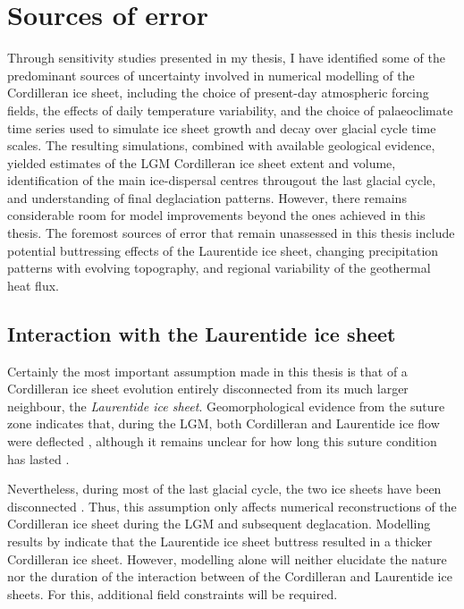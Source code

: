\documentclass[a4paper]{kappa}
\begin{document}
\section{Sources of error}

Through sensitivity studies presented in my thesis, I have identified some of
the predominant sources of uncertainty involved in numerical modelling of the
Cordilleran ice sheet, including the choice of present-day atmospheric forcing
fields, the effects of daily temperature variability, and the choice of
palaeoclimate time series used to simulate ice sheet growth and decay over
glacial cycle
time scales. The resulting simulations, combined with available geological
evidence, yielded estimates of the LGM Cordilleran ice sheet extent and volume,
identification of the main ice-dispersal centres througout the last glacial
cycle, and understanding of final deglaciation patterns. However, there remains
considerable room for model improvements beyond the ones achieved in this
thesis. The foremost sources of error that remain unassessed in this thesis
include potential buttressing effects of the Laurentide ice sheet, changing
precipitation patterns with evolving topography, and regional variability of
the geothermal heat flux.


\subsection{Interaction with the Laurentide ice sheet}

Certainly the most important assumption made in this thesis is that of a
Cordilleran ice sheet evolution entirely disconnected from its much larger
neighbour, the \emph{Laurentide ice sheet}. Geomorphological evidence from the
suture zone indicates that, during the LGM, both Cordilleran and Laurentide ice
flow were deflected \citep{Kleman.etal.2010, Margold.etal.2013,
Margold.etal.2013a}, although it remains unclear for how long this suture
condition has lasted \citep{Jackson.etal.1997, Bednarski.Smith.2007,
Gowan.2013}.

Nevertheless, during most of the last glacial cycle, the two ice sheets have
been disconnected \citep{Kleman.etal.2010}. Thus, this assumption only affects
numerical reconstructions of the Cordilleran ice sheet during the LGM and
subsequent deglacation. Modelling results by \citet{Gregoire.etal.2012}
indicate that the Laurentide ice sheet buttress resulted in a thicker
Cordilleran ice sheet. However, modelling alone will neither elucidate the
nature nor the duration of the interaction between of the Cordilleran and
Laurentide ice sheets. For this, additional field constraints will be required.
\end{document}
